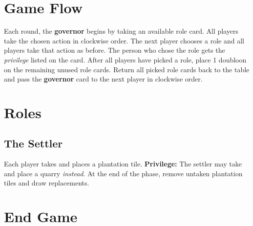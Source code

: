 \documentclass[12pt]{article}
\begin{document}
\begin{mdframed}[style = customFrame]
\begin{multicols*}{2}
\section*{Game Flow}
Each round, the \textbf{governor} begins by taking an available role card. All players take the chosen action in clockwise order. The next player chooses a role and all players take that action as before. The person who chose the role gets the \emph{privilege} listed on the card. After all players have picked a role, place 1 doubloon on the remaining unused role cards. Return all picked role cards back to the table and pass the \textbf{governor} card to the next player in clockwise order.

\section*{Roles}
\subsection*{The Settler}
Each player takes and places a plantation tile. \textbf{Privilege:} The settler may take and place a quarry \emph{instead}. At the end of the phase, remove untaken plantation tiles and draw replacements.


\section*{End Game}

\end{multicols*}
\end{mdframed}
\end{document}
